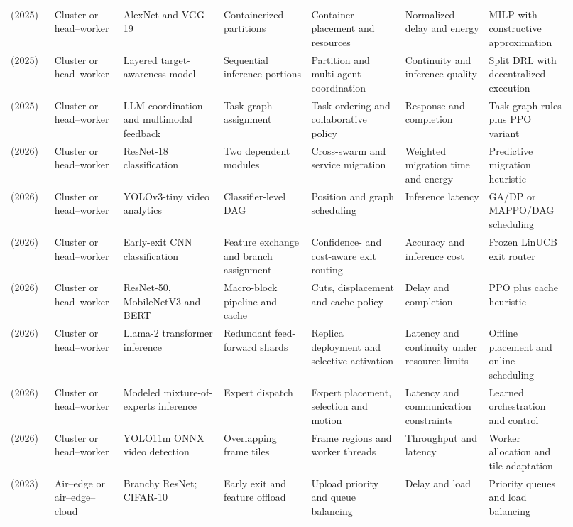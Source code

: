 \begin{longtable}{@{}Y{0.075\linewidth}Y{0.111\linewidth}Y{0.169\linewidth}Y{0.145\linewidth}Y{0.151\linewidth}Y{0.125\linewidth}Y{0.139\linewidth}@{}}
\cite{R0083} (2025) & Cluster or head--worker & AlexNet and VGG-19 & Containerized partitions & Container placement and resources & Normalized delay and energy & MILP with constructive approximation \\
\cite{R0106} (2025) & Cluster or head--worker & Layered target-awareness model & Sequential inference portions & Partition and multi-agent coordination & Continuity and inference quality & Split DRL with decentralized execution \\
\cite{R0223} (2025) & Cluster or head--worker & LLM coordination and multimodal feedback & Task-graph assignment & Task ordering and collaborative policy & Response and completion & Task-graph rules plus PPO variant \\
\cite{R0002} (2026) & Cluster or head--worker & ResNet-18 classification & Two dependent modules & Cross-swarm and service migration & Weighted migration time and energy & Predictive migration heuristic \\
\cite{R0048} (2026) & Cluster or head--worker & YOLOv3-tiny video analytics & Classifier-level DAG & Position and graph scheduling & Inference latency & GA/\allowbreak{}DP or MAPPO/\allowbreak{}DAG scheduling \\
\cite{R0075} (2026) & Cluster or head--worker & Early-exit CNN classification & Feature exchange and branch assignment & Confidence- and cost-aware exit routing & Accuracy and inference cost & Frozen LinUCB exit router \\
\cite{R0095} (2026) & Cluster or head--worker & ResNet-50, MobileNetV3 and BERT & Macro-block pipeline and cache & Cuts, displacement and cache policy & Delay and completion & PPO plus cache heuristic \\
\cite{R0110} (2026) & Cluster or head--worker & Llama-2 transformer inference & Redundant feed-forward shards & Replica deployment and selective activation & Latency and continuity under resource limits & Offline placement and online scheduling \\
\cite{R0118} (2026) & Cluster or head--worker & Modeled mixture-of-experts inference & Expert dispatch & Expert placement, selection and motion & Latency and communication constraints & Learned orchestration and control \\
\cite{R0125} (2026) & Cluster or head--worker & YOLO11m ONNX video detection & Overlapping frame tiles & Frame regions and worker threads & Throughput and latency & Worker allocation and tile adaptation \\
\cite{R0089} (2023) & Air--edge or air--edge--cloud & Branchy ResNet; CIFAR-10 & Early exit and feature offload & Upload priority and queue balancing & Delay and load & Priority queues and load balancing \\

\end{longtable}

